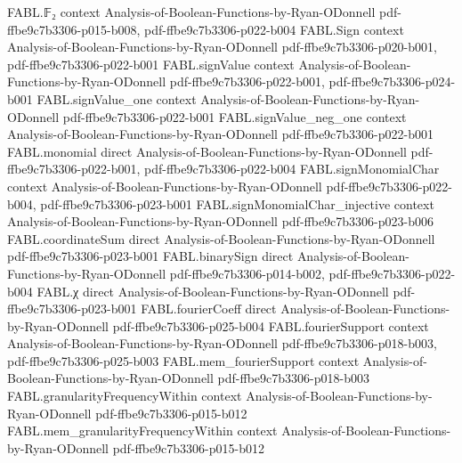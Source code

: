 \begin{theorem}
\label{FABL.signValue_orFunction}
\leanok
{}
\proofstep
  {FABL.𝔽₂}
  {context}
  {Analysis-of-Boolean-Functions-by-Ryan-ODonnell}
  {pdf-ffbe9c7b3306-p015-b008,
    pdf-ffbe9c7b3306-p022-b004}
\proofstep
  {FABL.Sign}
  {context}
  {Analysis-of-Boolean-Functions-by-Ryan-ODonnell}
  {pdf-ffbe9c7b3306-p020-b001,
    pdf-ffbe9c7b3306-p022-b001}
\proofstep
  {FABL.signValue}
  {context}
  {Analysis-of-Boolean-Functions-by-Ryan-ODonnell}
  {pdf-ffbe9c7b3306-p022-b001,
    pdf-ffbe9c7b3306-p024-b001}
\proofstep
  {FABL.signValue_one}
  {context}
  {Analysis-of-Boolean-Functions-by-Ryan-ODonnell}
  {pdf-ffbe9c7b3306-p022-b001}
\proofstep
  {FABL.signValue_neg_one}
  {context}
  {Analysis-of-Boolean-Functions-by-Ryan-ODonnell}
  {pdf-ffbe9c7b3306-p022-b001}
\proofstep
  {FABL.monomial}
  {direct}
  {Analysis-of-Boolean-Functions-by-Ryan-ODonnell}
  {pdf-ffbe9c7b3306-p022-b001,
    pdf-ffbe9c7b3306-p022-b004}
\proofstep
  {FABL.signMonomialChar}
  {context}
  {Analysis-of-Boolean-Functions-by-Ryan-ODonnell}
  {pdf-ffbe9c7b3306-p022-b004,
    pdf-ffbe9c7b3306-p023-b001}
\proofstep
  {FABL.signMonomialChar_injective}
  {context}
  {Analysis-of-Boolean-Functions-by-Ryan-ODonnell}
  {pdf-ffbe9c7b3306-p023-b006}
\proofstep
  {FABL.coordinateSum}
  {direct}
  {Analysis-of-Boolean-Functions-by-Ryan-ODonnell}
  {pdf-ffbe9c7b3306-p023-b001}
\proofstep
  {FABL.binarySign}
  {direct}
  {Analysis-of-Boolean-Functions-by-Ryan-ODonnell}
  {pdf-ffbe9c7b3306-p014-b002,
    pdf-ffbe9c7b3306-p022-b004}
\proofstep
  {FABL.χ}
  {direct}
  {Analysis-of-Boolean-Functions-by-Ryan-ODonnell}
  {pdf-ffbe9c7b3306-p023-b001}
\proofstep
  {FABL.fourierCoeff}
  {direct}
  {Analysis-of-Boolean-Functions-by-Ryan-ODonnell}
  {pdf-ffbe9c7b3306-p025-b004}
\proofstep
  {FABL.fourierSupport}
  {context}
  {Analysis-of-Boolean-Functions-by-Ryan-ODonnell}
  {pdf-ffbe9c7b3306-p018-b003,
    pdf-ffbe9c7b3306-p025-b003}
\proofstep
  {FABL.mem_fourierSupport}
  {context}
  {Analysis-of-Boolean-Functions-by-Ryan-ODonnell}
  {pdf-ffbe9c7b3306-p018-b003}
\proofstep
  {FABL.granularityFrequencyWithin}
  {context}
  {Analysis-of-Boolean-Functions-by-Ryan-ODonnell}
  {pdf-ffbe9c7b3306-p015-b012}
\proofstep
  {FABL.mem_granularityFrequencyWithin}
  {context}
  {Analysis-of-Boolean-Functions-by-Ryan-ODonnell}
  {pdf-ffbe9c7b3306-p015-b012}

\end{theorem}
